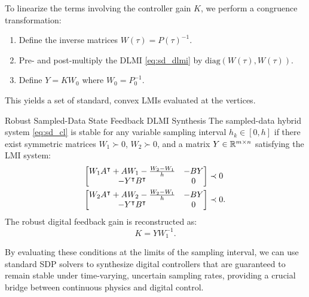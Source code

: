 To linearize the terms involving the controller gain $K$, we perform a congruence transformation:
\begin{enumerate}
    \item Define the inverse matrices $W(\tau) = P(\tau)^{-1}$.
    \item Pre- and post-multiply the DLMI \eqref{eq:sd_dlmi} by $\text{diag}(W(\tau), W(\tau))$.
    \item Define $Y = K W_0$ where $W_0 = P_0^{-1}$.
\end{enumerate}
This yields a set of standard, convex LMIs evaluated at the vertices.

\begin{mytheorem}{Robust Sampled-Data State Feedback DLMI Synthesis}
The sampled-data hybrid system \eqref{eq:sd_cl} is stable for any variable sampling interval $h_k \in [0, h]$ if there exist symmetric matrices $W_1 \succ 0$, $W_2 \succ 0$, and a matrix $Y \in \mathbb{R}^{m \times n}$ satisfying the LMI system:
\begin{align}
    \begin{bmatrix} W_1 A^\intercal + A W_1 - \frac{W_2 - W_1}{h} & -B Y \\ -Y^\intercal B^\intercal & 0 \end{bmatrix} &\prec 0 \label{eq:sd_vertex1} \\
    \begin{bmatrix} W_2 A^\intercal + A W_2 - \frac{W_2 - W_1}{h} & -B Y \\ -Y^\intercal B^\intercal & 0 \end{bmatrix} &\prec 0 . \label{eq:sd_vertex2}
\end{align}
The robust digital feedback gain is reconstructed as:
\begin{equation}
    K = Y W_1^{-1} . \label{eq:sd_k_reconstruct}
\end{equation}
\end{mytheorem}
By evaluating these conditions at the limits of the sampling interval, we can use standard SDP solvers to synthesize digital controllers that are guaranteed to remain stable under time-varying, uncertain sampling rates, providing a crucial bridge between continuous physics and digital control.
